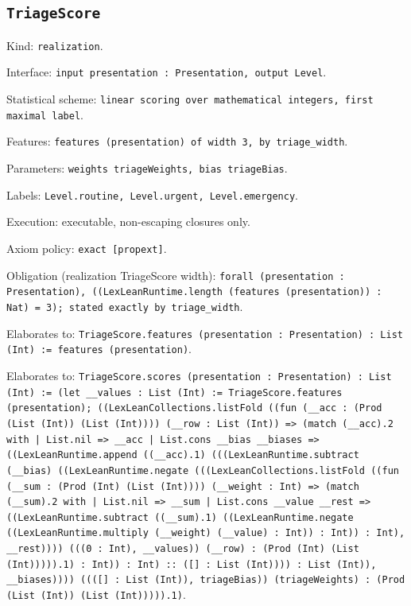 \documentclass[11pt]{article}
\begin{document}
\subsection*{\texttt{TriageScore}}
\noindent Kind: \texttt{realization}.\par
\noindent Interface: \texttt{input presentation : Presentation, output Level}.\par
\noindent Statistical scheme: \texttt{linear scoring over mathematical integers, first maximal label}.\par
\noindent Features: \texttt{features (presentation) of width 3, by triage\_width}.\par
\noindent Parameters: \texttt{weights triageWeights, bias triageBias}.\par
\noindent Labels: \texttt{Level.routine, Level.urgent, Level.emergency}.\par
\noindent Execution: executable, non-escaping closures only.\par
\noindent Axiom policy: \texttt{exact [propext]}.\par
\noindent Obligation (realization TriageScore width): \texttt{forall (presentation : Presentation), ((LexLeanRuntime.length (features (presentation)) : Nat) = 3); stated exactly by triage\_width}.\par
\noindent Elaborates to: \texttt{TriageScore.features (presentation : Presentation) : List (Int) := features (presentation)}.\par
\noindent Elaborates to: \texttt{TriageScore.scores (presentation : Presentation) : List (Int) := (let \_\_values : List (Int) := TriageScore.features (presentation); ((LexLeanCollections.listFold ((fun (\_\_acc : (Prod (List (Int)) (List (Int)))) (\_\_row : List (Int)) => (match (\_\_acc).2 with | List.nil => \_\_acc | List.cons \_\_bias \_\_biases => ((LexLeanRuntime.append ((\_\_acc).1) (((LexLeanRuntime.subtract (\_\_bias) ((LexLeanRuntime.negate (((LexLeanCollections.listFold ((fun (\_\_sum : (Prod (Int) (List (Int)))) (\_\_weight : Int) => (match (\_\_sum).2 with | List.nil => \_\_sum | List.cons \_\_value \_\_rest => ((LexLeanRuntime.subtract ((\_\_sum).1) ((LexLeanRuntime.negate ((LexLeanRuntime.multiply (\_\_weight) (\_\_value) : Int)) : Int)) : Int), \_\_rest)))) (((0 : Int), \_\_values)) (\_\_row) : (Prod (Int) (List (Int))))).1) : Int)) : Int) :: ([] : List (Int)))) : List (Int)), \_\_biases)))) ((([] : List (Int)), triageBias)) (triageWeights) : (Prod (List (Int)) (List (Int))))).1)}.\par
\end{document}
